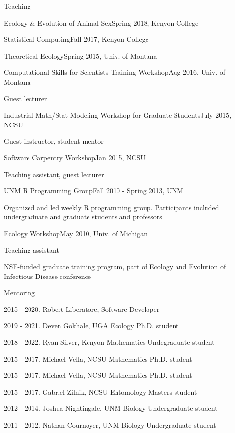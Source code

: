 \documentclass{resume} %
\begin{document}
\begin{rSection}{Teaching}
\begin{rSubsection}{Ecology \& Evolution of Animal Sex}{Spring 2018, Kenyon College}{}{}
\nullitem
\end{rSubsection}
\begin{rSubsection}{Statistical Computing}{Fall 2017, Kenyon College}{}{}
\nullitem
\end{rSubsection}
\begin{rSubsection}{Theoretical Ecology}{Spring 2015, Univ. of Montana}{}{}
\nullitem
\end{rSubsection}
\begin{rSubsection}{Computational Skills for Scientists Training Workshop}{Aug 2016, Univ. of Montana}{}{}
\item Guest lecturer
\end{rSubsection}
\begin{rSubsection}{Industrial Math/Stat Modeling Workshop for Graduate Students}{July 2015, NCSU}{}{}
\item Guest instructor, student mentor
\end{rSubsection}
\begin{rSubsection}{Software Carpentry Workshop}{Jan 2015, NCSU}{}{}
\item Teaching assistant, guest lecturer
\end{rSubsection}
\begin{rSubsection}{UNM R Programming Group}{Fall 2010 - Spring 2013, UNM}{}{}
\item Organized and led weekly R programming group. Participants included undergraduate and graduate students and professors
\end{rSubsection}
\begin{rSubsection}{Ecology Workshop}{May 2010, Univ. of Michigan}{}{}
\item Teaching assistant
\item NSF-funded graduate training program, part of Ecology and Evolution of Infectious
Disease conference
\end{rSubsection}
\end{rSection}

\begin{rSection}{Mentoring}
\item 2015 - 2020. Robert Liberatore, Software Developer
\item 2019 - 2021. Deven Gokhale, UGA Ecology Ph.D. student
\item 2018 - 2022. Ryan Silver, Kenyon Mathematics Undegraduate student
\item 2015 - 2017. Michael Vella, NCSU Mathematics Ph.D. student
\item 2015 - 2017. Michael Vella, NCSU Mathematics Ph.D. student
\item 2015 - 2017. Gabriel Zilnik, NCSU Entomology Masters student
\item 2012 - 2014. Joshua Nightingale, UNM Biology Undergraduate student
\item 2011 - 2012. Nathan Cournoyer, UNM Biology Undergraduate student
\end{rSection}
\end{document}
